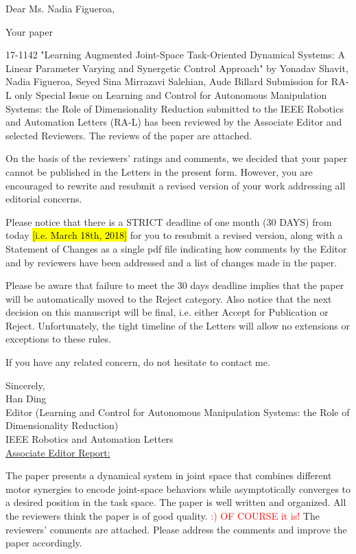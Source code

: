 \documentclass[10pt,stdletter,dateno]{newlfm}
\begin{document}
\begin{newlfm}
\vspace{-2in}
Dear Ms. Nadia Figueroa,

Your paper

17-1142
"Learning Augmented Joint-Space Task-Oriented Dynamical Systems: A
Linear Parameter Varying and Synergetic Control Approach"
by Yonadav Shavit, Nadia Figueroa, Seyed Sina Mirrazavi Salehian, Aude
Billard Submission for RA-L only Special Issue on Learning and Control for
Autonomous Manipulation Systems: the Role of Dimensionality Reduction submitted to the IEEE Robotics and Automation Letters (RA-L) has been reviewed by the Associate Editor and selected Reviewers. The reviews of the paper are attached.

On the basis of the reviewers' ratings and comments, we decided that
your paper cannot be published in the Letters in the present form.
However, you are encouraged to rewrite and resubmit a revised version
of your work addressing all editorial concerns.

Please notice that there is a STRICT deadline of one month (30 DAYS)
from today \hl{[i.e. March 18th, 2018]} for you to resubmit a revised version, along with a
Statement of Changes as a single pdf file indicating how comments by
the Editor and by reviewers have been addressed and a list of changes
made in the paper.

Please be aware that failure to meet the 30 days deadline implies that
the paper will be automatically moved to the Reject category. Also
notice that the next decision on this manuscript will be final, i.e.
either Accept for Publication or Reject. Unfortunately, the tight
timeline of the Letters will allow no extensions or exceptions to these
rules.

If you have any related concern, do not hesitate to contact me.

Sincerely,\\
Han Ding\\
Editor (Learning and Control for Autonomous Manipulation Systems: the
Role of Dimensionality Reduction)\\
IEEE Robotics and Automation Letters\\

\underline{Associate Editor Report:}

The paper presents a dynamical system in joint space that combines
different motor synergies to encode joint-space behaviors while
asymptotically converges to a desired position in the task space. The
paper is well written and organized. All the reviewers think the paper
is of good quality. \textcolor{red}{:) OF COURSE it is!} The reviewers’ comments are attached. Please
address the comments and improve the paper accordingly.



\end{newlfm}
\end{document}

